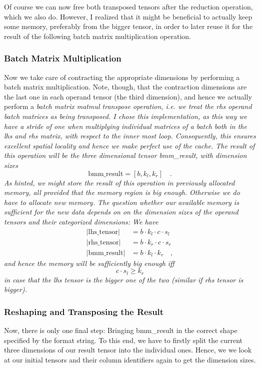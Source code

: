 \documentclass[sigconf]{acmart}
\renewcommand{\texttt}[1]{\begingroup\ttfamily\sloppy\hbadness=10000 #1\endgroup}
\begin{document}
Of course we can now free both transposed tensors after the reduction operation, which we also do. However, I realized that it might be beneficial to actually keep some memory, preferably from the bigger tensor, in order to later reuse it for the result of the following batch matrix multiplication operation.

\subsubsection{Batch Matrix Multiplication}
Now we take care of contracting the appropriate dimensions by performing a batch matrix multiplication. Note, though, that the contraction dimensions are the last one in each operand tensor (the third dimension), and hence we actually perform a \em batch matrix matmul transpose \em operation, i.e. we treat the rhs operand batch matrices as being transposed. I chose this implementation, as this way we have a stride of one when multiplying individual matrices of a batch both in the lhs and rhs matrix, with respect to the inner most loop. Consequently, this ensures excellent spatial locality and hence we make perfect use of the cache. The result of this operation will be the three dimensional tensor \texttt{bmm\_result}, with dimension sizes
\[ \text{bmm\_result} = [b, k_l, k_r] \quad . \]
As hinted, we might store the result of this operation in previously allocated memory, all provided that the memory region is big enough. Otherwise we do have to allocate new memory. The question whether our available memory is sufficient for the new data depends on on the dimension sizes of the operand tensors and their categorized dimensions: We have
\begin{align*}
|\text{lhs\_tensor}| &= b \cdot k_l \cdot c \cdot s_l \\
|\text{rhs\_tensor}| &= b \cdot k_r \cdot c \cdot s_r \\
|\text{bmm\_result}| &= b \cdot k_l \cdot k_r \quad ,
\end{align*}
and hence the memory will be sufficiently big enough iff
\[ c \cdot s_l \geq k_r \]
in case that the lhs tensor is the bigger one of the two (similar if rhs tensor is bigger).


\subsubsection{Reshaping and Transposing the Result}
Now, there is only one final step: Bringing \texttt{bmm\_result} in the correct shape specified by the format string. To this end, we have to firstly split the current three dimensions of our result tensor into the individual ones. Hence, we we look at our initial tensors and their column identifiers again to get the dimension sizes.
\end{document}
